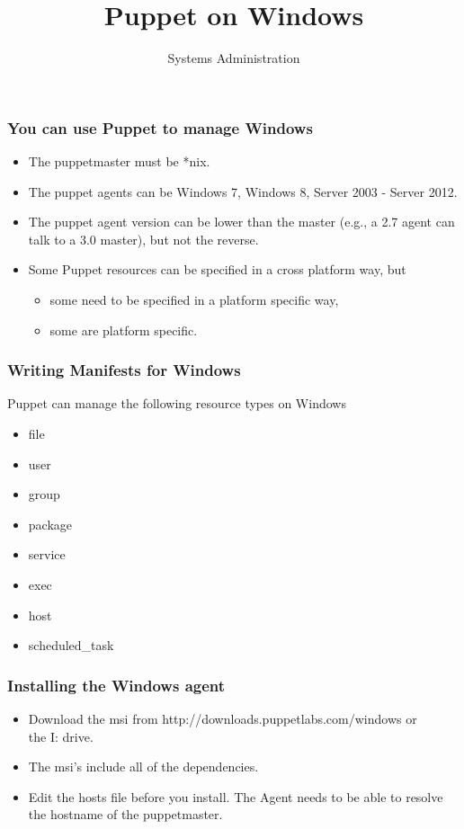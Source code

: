 \documentclass[10pt]{beamer}
\title{Puppet on Windows}
\author[IN719]{Systems Administration}
\institute[Otago Polytechnic]{
  Otago Polytechnic \\
  Dunedin, New Zealand \\
}
\date{}
\begin{document}
\begin{frame}[plain]
  \titlepage
\end{frame}

\begin{frame}
  \frametitle{You can use Puppet to manage Windows}
  
\begin{itemize}
\item The puppetmaster must be *nix.
\item  The puppet agents can be Windows 7, Windows 8,  Server 2003 - Server 2012.
\item  The puppet agent version can be lower than the master (e.g., a 2.7 agent can talk to a 3.0 master), but not the reverse.
\item Some Puppet resources can be specified in a cross platform way, but
         \begin{itemize}
\item  some need to be specified in a platform specific way,
\item  some are platform specific.
\end{itemize}
\end{itemize}
\end{frame}


\begin{frame}
 \frametitle{Writing Manifests for Windows}
  
Puppet can manage the following resource types on Windows
\begin{itemize}
\item file
\item user
\item group
\item package
\item service
\item exec
\item host
\item scheduled\_task
\end{itemize}


\end{frame}

\begin{frame}
  \frametitle{Installing the Windows agent}
  
\begin{itemize}
\item Download the msi from http://downloads.puppetlabs.com/windows or \\ the I: drive.
\item The msi's include all of the dependencies.
\item Edit the hosts file before you install.  The Agent needs to be able to resolve the hostname of the puppetmaster.
\end{itemize}


\end{frame}
\end{document}
